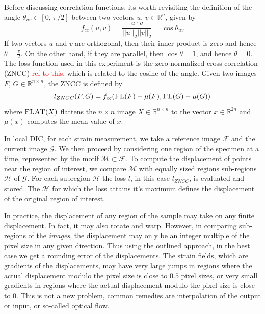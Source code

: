 \documentclass[5p,a4paper]{elsarticle}
\begin{document}
	Before discussing correlation functions, its worth revisiting the definition of the angle $\theta_{uv} \in [0,\,\pi/2]$ between two vectors $u,\, v \in \mathbb{R}^n$, given by
	\begin{equation}
		f_{cc}(u, v) = \frac{u\cdot v}{||u||_2 ||v||_2} = \cos{\theta_{uv}}
	\end{equation}
	If two vectors $u$ and $v$ are orthogonal, then their inner product is zero and hence $\theta = \frac{\pi}{2}$. On the other hand, if they are parallel, then $\cos{\theta} = 1$, and hence $\theta=0$. The loss function used in this experiment is the zero-normalized cross-correlation (ZNCC) \textcolor{red}{ref to this}, which is related to the cosine of the angle. Given two images $F,\,G \in \mathbb{R}^{n\times n}$, the ZNCC is defined by
	\begin{equation}
		l_{ZNCC}(F, G) = f_{cc}(\textsc{FL}(F) - \mu(F), \textsc{FL}(G) - \mu(G))
	\end{equation}
	where $\textsc{FLAT}(X)$ flattens the $n\times n$ image $X\in \mathbb{R}^{n\times n}$ to the vector $x\in \mathbb{R}^{2n}$ and $\mu(x)$ computes the mean value of $x$. 
	
	In local DIC, for each strain measurement, we take a reference image $\mathcal{F}$ and the current image $\mathcal{G}$. We then proceed by considering one region of the specimen at a time, represented by the motif $\mathcal{M}\subset\mathcal{F}$. To compute the displacement of points near the region of interest, we compare $\mathcal{M}$ with equally sized regions sub-regions $\mathcal{H}$ of $\mathcal{G}$. For each subregion $\mathcal{H}$ the loss $l$, in this case $l_{ZNCC}$, is evaluated and stored. The $\mathcal{H}$ for which the loss attains it's maximum defines the displacement of the original region of interest.  
	
	In practice, the displacement of any region of the sample may take on any finite displacement. In fact, it may also rotate and warp. However, in comparing sub-regions of the \textit{images}, the displacement may only be an integer multiple of the pixel size in any given direction. Thus using the outlined approach, in the best case we get a rounding error of the displacements. The strain fields, which are gradients of the displacements, may have very large jumps in regions where the actual displacement modulo the pixel size is close to $0.5$ pixel sizes, or very small gradients in regions where the actual displacement modulo the pixel size is close to $0$. This is not a new problem, common remedies are interpolation of the output or input, or so-called optical flow.
	
\end{document}
